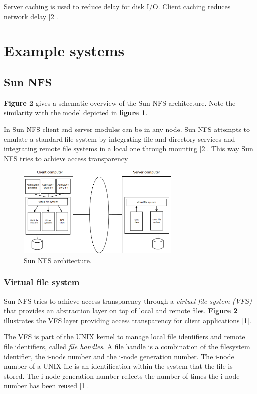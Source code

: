 Server caching is used to reduce delay for disk I/O. Client caching reduces network delay [2].



\section{Example systems}

\subsection{Sun NFS}

\textbf{Figure 2} gives a schematic overview of the Sun NFS architecture. Note the similarity with the model depicted in \textbf{figure 1}.

In Sun NFS client and server modules can be in any node. Sun NFS attempts to emulate a standard file system by integrating file and directory services and integrating remote file systems in a local one through mounting [2]. This way Sun NFS tries to achieve access transparency.


\begin{figure}
	\begin{center}
		\includegraphics[width=0.7\textwidth]{img/nfs}
	\end{center}
	\caption{Sun NFS architecture.}
	\label{fig:nfs}
\end{figure}



\subsubsection{Virtual file system}

Sun NFS tries to achieve access transparency through a \emph{virtual file system (VFS)} that provides an abstraction layer on top of local and remote files. \textbf{Figure 2} illustrates the VFS layer providing access transparency for client applications [1].

The VFS is part of the UNIX kernel to manage local file identifiers and remote file identifiers, called \emph{file handles}. A file handle is a combination of the filesystem identifier, the i-node number and the i-node generation number. The i-node number of a UNIX file is an identification within the system that the file is stored. The i-node generation number reflects the number of times the i-node number has been reused [1].


